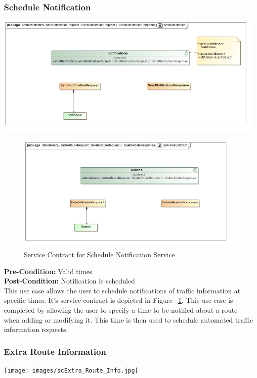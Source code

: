 \documentclass[a4paper,12pt]{article}
\begin{document}
\subsubsection{Schedule Notification}
\includegraphics[width=\textwidth]{images/scSchedule_Notification.jpg}
\begin{figure}[here]
\includegraphics[width=\textwidth]{images/scDelete_Route.jpg}
\caption{Service Contract for Schedule Notification Service}
\label{fig:sc_notification}
\end{figure}

\textbf{Pre-Condition: }
Valid times\\
\textbf{Post-Condition: }
Notification is scheduled\\

This use case allows the user to schedule notifications of traffic information at specific times. It's service contract is depicted in Figure ~\ref{fig:sc_notification}. This use case is completed by allowing the user to specify a time to be notified about a route when adding or modifying it. This time is then used to schedule automated traffic information requests.

\subsubsection{Extra Route Information}
\texttt{[image: images/scExtra\_Route\_Info.jpg]}
\end{document}
